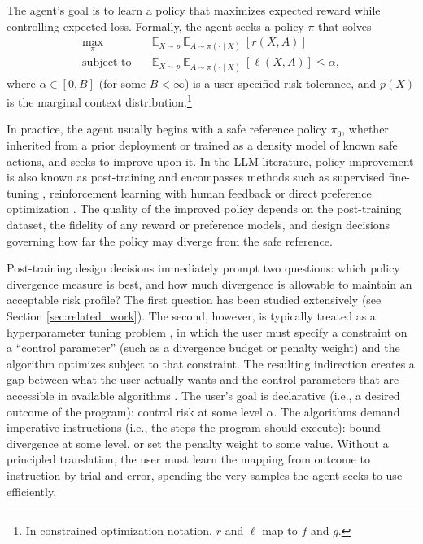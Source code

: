 The agent's goal is to learn a policy that maximizes expected reward while controlling expected loss.
Formally, the agent seeks a policy $\pi$ that solves
\begin{align}\label{eq:constrained_policy_opt}
    \max_{\pi} \quad & \mathbb{E}_{X \sim p} \ \mathbb{E}_{A \sim \pi(\cdot \mid X)} \ [r(X, A)] \nonumber \\
    \text{subject to} \quad & \mathbb{E}_{X \sim p} \ \mathbb{E}_{A \sim \pi(\cdot \mid X)} \ [\ell(X, A)] \leq \alpha,
\end{align}
where $\alpha \in [0, B]$ (for some $B<\infty$) is a user-specified risk tolerance,  and $p(X)$ is the marginal context distribution.\footnote{In constrained optimization notation, $r$ and $\ell$ map to $f$ and $g$.}

In practice, the agent usually begins with a safe reference policy $\pi_0$, whether inherited from a prior deployment or trained as a density model of known safe actions, and seeks to improve upon it.
In the LLM literature, policy improvement is also known as post-training and encompasses methods such as supervised fine-tuning \citep[SFT;][]{wei2022finetuned}, reinforcement learning with human feedback \citep[RLHF;][]{christiano2017deep} or direct preference optimization \citep[DPO;][]{rafailov2023direct}.
The quality of the improved policy depends on the post-training dataset, the fidelity of any reward or preference models, and design decisions governing how far the policy may diverge from the safe reference. 

Post-training design decisions immediately prompt two questions: which policy divergence measure is best, and how much divergence is allowable to maintain an acceptable risk profile?
The first question has been studied extensively (see Section \ref{sec:related_work}).
The second, however, is typically treated as a hyperparameter tuning problem \citep{bergstra2011algorithms, feurer2019hyperparameter}, in which the user must specify a constraint on a ``control parameter'' (such as a divergence budget or penalty weight) and the algorithm optimizes subject to that constraint.
The resulting indirection creates a gap between what the user actually wants and the control parameters that are accessible in available algorithms \citep{hutchins1986direct, norman1988design}.
The user's goal is declarative (i.e., a desired outcome of the program): control risk at some level $\alpha$.
The algorithms demand imperative instructions (i.e., the steps the program should execute): bound divergence at some level, or set the penalty weight to some value.
Without a principled translation, the user must learn the mapping from outcome to instruction by trial and error, spending the very samples the agent seeks to use efficiently.

